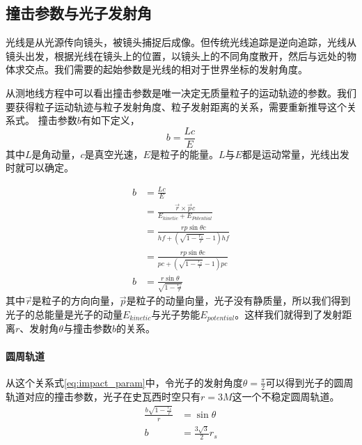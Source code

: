 \subsection{撞击参数与光子发射角}
光线是从光源传向镜头，被镜头捕捉后成像。但传统光线追踪是逆向追踪，光线从镜头出发，根据光线在镜头上的位置，以镜头上的不同角度散开，然后与远处的物体求交点。我们需要的起始参数是光线的相对于世界坐标的发射角度。

从测地线方程中可以看出撞击参数是唯一决定无质量粒子的运动轨迹的参数。我们要获得粒子运动轨迹与粒子发射角度、粒子发射距离的关系，需要重新推导这个关系式。
撞击参数$b$有如下定义，
\begin{equation}
    b=\frac{Lc}{E}
\end{equation}
其中$L$是角动量，$c$是真空光速，$E$是粒子的能量。$L$与$E$都是运动常量，光线出发时就可以确定。

\begin{equation}
    \begin{split}
        b&=\frac{Lc}{E}\\&=\frac{\vec{r}\times\vec{p}c}{E_{kinetic}+E_{Potential}}\\&=\frac{rp\sin\theta c}{hf+\left(\sqrt{1-\frac{r_{s}}{r}}-1\right)hf}\\&=\frac{rp\sin\theta c}{pc+\left(\sqrt{1-\frac{r_{s}}{r}}-1\right)pc}\\b&=\frac{r\sin\theta}{\sqrt{1-\frac{r_{s}}{r}}}\label{eq:impact_param}
    \end{split}
\end{equation}
其中$\vec{r}$是粒子的方向向量，$\vec{p}$是粒子的动量向量，光子没有静质量，所以我们得到光子的总能量是光子的动量$E_{kinetic}$与光子势能$E_{potential}$。这样我们就得到了发射距离$r$、发射角$\theta$与撞击参数$b$的关系。

\paragraph{圆周轨道}
从这个关系式\eqref{eq:impact_param}中，令光子的发射角度$\theta=\frac{\pi}{2}$可以得到光子的圆周轨道对应的撞击参数，光子在史瓦西时空只有$r=3M$这一个不稳定圆周轨道。
\begin{equation*}
    \begin{split}
        \frac{b\sqrt{1-\frac{r_{s}}{r}}}{r}&=\sin\theta\\
        b&=\frac{3\sqrt{3}}{2}r_{s}\label{eq:circular_orbit}
    \end{split}
\end{equation*}


